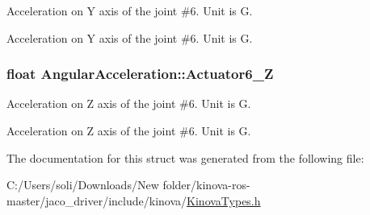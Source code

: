 Acceleration on Y axis of the joint \#6. Unit is G. 

Acceleration on Y axis of the joint \#6. Unit is G. 
\subsubsection[{\texorpdfstring{Actuator6\+\_\+Z}{Actuator6_Z}}]{\setlength{\rightskip}{0pt plus 5cm}float Angular\+Acceleration\+::\+Actuator6\+\_\+Z}\hypertarget{struct_angular_acceleration_a22ce9847bc5c4aee829b734081e944fd}{}\label{struct_angular_acceleration_a22ce9847bc5c4aee829b734081e944fd}


Acceleration on Z axis of the joint \#6. Unit is G. 

Acceleration on Z axis of the joint \#6. Unit is G. 

The documentation for this struct was generated from the following file\+:\begin{DoxyCompactItemize}
\item 
C\+:/\+Users/soli/\+Downloads/\+New folder/kinova-\/ros-\/master/jaco\+\_\+driver/include/kinova/\hyperlink{_kinova_types_8h}{Kinova\+Types.\+h}\end{DoxyCompactItemize}
